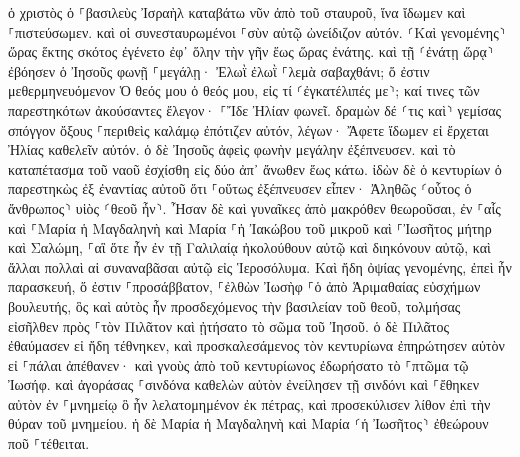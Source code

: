 \documentclass[twoside, 9pt]{extreport}
\begin{document}
ὁ χριστὸς ὁ ⸀βασιλεὺς Ἰσραὴλ καταβάτω νῦν ἀπὸ τοῦ σταυροῦ, ἵνα ἴδωμεν καὶ ⸀πιστεύσωμεν. καὶ οἱ συνεσταυρωμένοι ⸀σὺν αὐτῷ ὠνείδιζον αὐτόν. 
⸂Καὶ γενομένης⸃ ὥρας ἕκτης σκότος ἐγένετο ἐφ᾽ ὅλην τὴν γῆν ἕως ὥρας ἐνάτης. 
καὶ τῇ ⸂ἐνάτῃ ὥρᾳ⸃ ἐβόησεν ὁ Ἰησοῦς φωνῇ ⸀μεγάλῃ· Ἐλωῒ ἐλωῒ ⸀λεμὰ σαβαχθάνι; ὅ ἐστιν μεθερμηνευόμενον Ὁ θεός μου ὁ θεός μου, εἰς τί ⸂ἐγκατέλιπές με⸃; 
καί τινες τῶν παρεστηκότων ἀκούσαντες ἔλεγον· ⸀Ἴδε Ἠλίαν φωνεῖ. 
δραμὼν δέ ⸂τις καὶ⸃ γεμίσας σπόγγον ὄξους ⸀περιθεὶς καλάμῳ ἐπότιζεν αὐτόν, λέγων· Ἄφετε ἴδωμεν εἰ ἔρχεται Ἠλίας καθελεῖν αὐτόν. 
ὁ δὲ Ἰησοῦς ἀφεὶς φωνὴν μεγάλην ἐξέπνευσεν. 
καὶ τὸ καταπέτασμα τοῦ ναοῦ ἐσχίσθη εἰς δύο ἀπ᾽ ἄνωθεν ἕως κάτω. 
ἰδὼν δὲ ὁ κεντυρίων ὁ παρεστηκὼς ἐξ ἐναντίας αὐτοῦ ὅτι ⸀οὕτως ἐξέπνευσεν εἶπεν· Ἀληθῶς ⸂οὗτος ὁ ἄνθρωπος⸃ υἱὸς ⸂θεοῦ ἦν⸃. 
Ἦσαν δὲ καὶ γυναῖκες ἀπὸ μακρόθεν θεωροῦσαι, ἐν ⸀αἷς καὶ ⸀Μαρία ἡ Μαγδαληνὴ καὶ Μαρία ⸀ἡ Ἰακώβου τοῦ μικροῦ καὶ ⸀Ἰωσῆτος μήτηρ καὶ Σαλώμη, 
⸀αἳ ὅτε ἦν ἐν τῇ Γαλιλαίᾳ ἠκολούθουν αὐτῷ καὶ διηκόνουν αὐτῷ, καὶ ἄλλαι πολλαὶ αἱ συναναβᾶσαι αὐτῷ εἰς Ἱεροσόλυμα. 
Καὶ ἤδη ὀψίας γενομένης, ἐπεὶ ἦν παρασκευή, ὅ ἐστιν ⸀προσάββατον, 
⸀ἐλθὼν Ἰωσὴφ ⸀ὁ ἀπὸ Ἁριμαθαίας εὐσχήμων βουλευτής, ὃς καὶ αὐτὸς ἦν προσδεχόμενος τὴν βασιλείαν τοῦ θεοῦ, τολμήσας εἰσῆλθεν πρὸς ⸀τὸν Πιλᾶτον καὶ ᾐτήσατο τὸ σῶμα τοῦ Ἰησοῦ. 
ὁ δὲ Πιλᾶτος ἐθαύμασεν εἰ ἤδη τέθνηκεν, καὶ προσκαλεσάμενος τὸν κεντυρίωνα ἐπηρώτησεν αὐτὸν εἰ ⸀πάλαι ἀπέθανεν· 
καὶ γνοὺς ἀπὸ τοῦ κεντυρίωνος ἐδωρήσατο τὸ ⸀πτῶμα τῷ Ἰωσήφ. 
καὶ ἀγοράσας ⸀σινδόνα καθελὼν αὐτὸν ἐνείλησεν τῇ σινδόνι καὶ ⸀ἔθηκεν αὐτὸν ἐν ⸀μνημείῳ ὃ ἦν λελατομημένον ἐκ πέτρας, καὶ προσεκύλισεν λίθον ἐπὶ τὴν θύραν τοῦ μνημείου. 
ἡ δὲ Μαρία ἡ Μαγδαληνὴ καὶ Μαρία ⸂ἡ Ἰωσῆτος⸃ ἐθεώρουν ποῦ ⸀τέθειται. 
\end{document}
